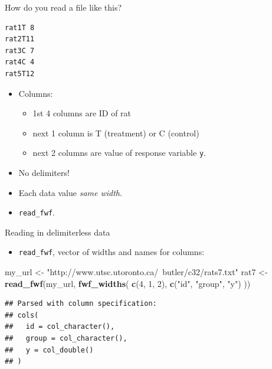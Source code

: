 \documentclass[ignorenonframetext,]{beamer}
\newenvironment{Shaded}{\begin{snugshade}}{\end{snugshade}}
\newcommand{\DecValTok}[1]{\textcolor[rgb]{0.00,0.00,0.81}{#1}}
\newcommand{\KeywordTok}[1]{\textcolor[rgb]{0.13,0.29,0.53}{\textbf{#1}}}
\newcommand{\NormalTok}[1]{#1}
\newcommand{\StringTok}[1]{\textcolor[rgb]{0.31,0.60,0.02}{#1}}
\providecommand{\tightlist}{%
  \setlength{\itemsep}{0pt}\setlength{\parskip}{0pt}}
\begin{document}
\begin{frame}[fragile]{How do you read a file like this?}
\protect\hypertarget{how-do-you-read-a-file-like-this}{}

\begin{verbatim}
rat1T 8
rat2T11
rat3C 7
rat4C 4
rat5T12
\end{verbatim}

\begin{itemize}
\tightlist
\item
  Columns:

  \begin{itemize}
  \tightlist
  \item
    1st 4 columns are ID of rat
  \item
    next 1 column is T (treatment) or C (control)
  \item
    next 2 columns are value of response variable \texttt{y}.
  \end{itemize}
\item
  No delimiters!
\item
  Each data value \emph{same width}.
\item
  \texttt{read\_fwf}.
\end{itemize}

\end{frame}

\begin{frame}[fragile]{Reading in delimiterless data}
\protect\hypertarget{reading-in-delimiterless-data}{}

\begin{itemize}
\tightlist
\item
  \texttt{read\_fwf}, vector of widths and names for columns:
\end{itemize}

\begin{Shaded}
\begin{Highlighting}[]
\NormalTok{my_url <-}\StringTok{ "http://www.utsc.utoronto.ca/~butler/c32/rats7.txt"}
\NormalTok{rat7 <-}\StringTok{ }\KeywordTok{read_fwf}\NormalTok{(my_url, }\KeywordTok{fwf_widths}\NormalTok{(}
  \KeywordTok{c}\NormalTok{(}\DecValTok{4}\NormalTok{, }\DecValTok{1}\NormalTok{, }\DecValTok{2}\NormalTok{),}
  \KeywordTok{c}\NormalTok{(}\StringTok{"id"}\NormalTok{, }\StringTok{"group"}\NormalTok{, }\StringTok{"y"}\NormalTok{)}
\NormalTok{))}
\end{Highlighting}
\end{Shaded}

\begin{verbatim}
## Parsed with column specification:
## cols(
##   id = col_character(),
##   group = col_character(),
##   y = col_double()
## )
\end{verbatim}

\end{frame}
\end{document}
